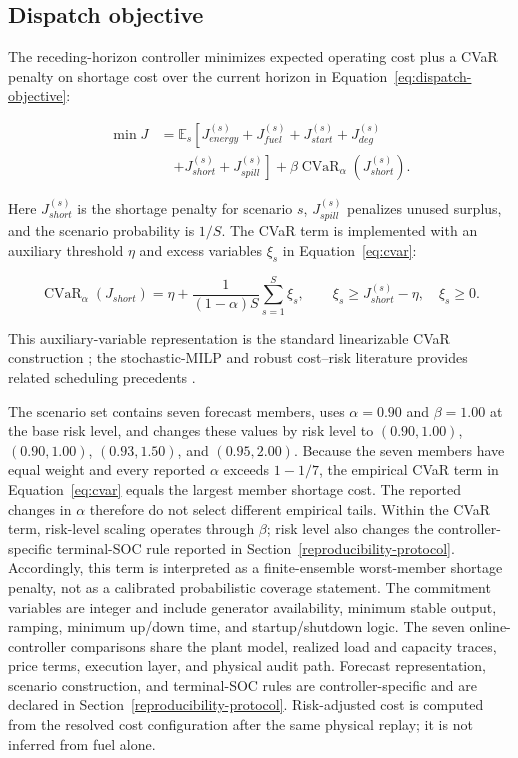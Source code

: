 \subsection{Dispatch objective}\label{dispatch-objective}

The receding-horizon controller minimizes expected operating cost plus a
CVaR penalty on shortage cost over the current horizon in
Equation~\eqref{eq:dispatch-objective}:

\begin{equation}
\label{eq:dispatch-objective}
\begin{aligned}
\min J &= \mathbb E_s\left[J_{energy}^{(s)}+J_{fuel}^{(s)}+J_{start}^{(s)}+J_{deg}^{(s)}\right.\\
&\quad\left.+J_{short}^{(s)}+J_{spill}^{(s)}\right]
+\beta\operatorname{CVaR}_{\alpha}\left(J_{short}^{(s)}\right).
\end{aligned}
\end{equation}

Here $J_{short}^{(s)}$ is the shortage penalty for scenario $s$,
$J_{spill}^{(s)}$ penalizes unused surplus, and the scenario probability is
$1/S$. The CVaR term is implemented with an auxiliary threshold $\eta$ and
excess variables $\xi_s$ in Equation~\eqref{eq:cvar}:

\begin{equation}
\label{eq:cvar}
\operatorname{CVaR}_{\alpha}(J_{short})=\eta+\frac{1}{(1-\alpha)S}\sum_{s=1}^{S}\xi_s,
\qquad \xi_s\geq J_{short}^{(s)}-\eta,\quad \xi_s\geq0.
\end{equation}

This auxiliary-variable representation is the standard linearizable CVaR
construction \citep{rockafellar2000cvar}; the stochastic-MILP and robust
cost--risk literature provides related scheduling precedents
\citep{franke2020stochasticmilp,ji2018robustcvar}.

The scenario set contains seven forecast members, uses $\alpha=0.90$
and $\beta=1.00$ at the base risk level, and changes these values by risk
level to $(0.90,1.00)$, $(0.90,1.00)$, $(0.93,1.50)$, and $(0.95,2.00)$.
Because the seven members have equal weight and every reported $\alpha$ exceeds
$1-1/7$, the empirical CVaR term in Equation~\eqref{eq:cvar} equals the largest
member shortage cost. The reported changes in $\alpha$ therefore do not select
different empirical tails. Within the CVaR term, risk-level scaling operates
through $\beta$; risk level also changes the controller-specific terminal-SOC
rule reported in Section~\ref{reproducibility-protocol}. Accordingly, this term
is interpreted as a finite-ensemble worst-member shortage penalty, not as a
calibrated probabilistic coverage statement.
The commitment variables are integer and include generator availability,
minimum stable output, ramping, minimum up/down time, and startup/shutdown
logic. The seven online-controller comparisons share the plant model, realized
load and capacity traces, price terms, execution layer, and physical audit path.
Forecast representation, scenario construction, and terminal-SOC rules are
controller-specific and are declared in Section~\ref{reproducibility-protocol}.
Risk-adjusted cost is computed from the resolved cost configuration after the
same physical replay; it is not
inferred from fuel alone.

